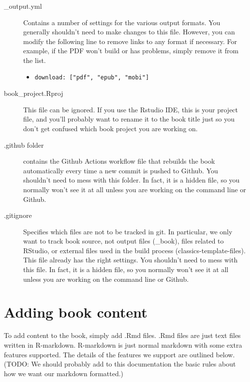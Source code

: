 \documentclass[
]{book}
\begin{document}
\begin{description}
\item[\_output.yml]
Contains a number of settings for the various output formats. You generally shouldn't need to make changes to this file. However, you can modify the following line to remove links to any format if necessary. For example, if the PDF won't build or has problems, simply remove it from the list.

\begin{itemize}
\item
\begin{verbatim}
download: ["pdf", "epub", "mobi"]
\end{verbatim}
\end{itemize}
\item[book\_project.Rproj]
This file can be ignored. If you use the Rstudio IDE, this is your project file, and you'll probably want to rename it to the book title just so you don't get confused which book project you are working on.
\item[.github folder]
contains the Github Actions workflow file that rebuilds the book automatically every time a new commit is pushed to Github. You shouldn't need to mess with this folder. In fact, it is a hidden file, so you normally won't see it at all unless you are working on the command line or Github.
\item[.gitignore]
Specifies which files are not to be tracked in git. In particular, we only want to track book source, not output files (\_book), files related to RStudio, or external files used in the build process (classics-template-files). This file already has the right settings. You shouldn't need to mess with this file. In fact, it is a hidden file, so you normally won't see it at all unless you are working on the command line or Github.
\end{description}

\hypertarget{adding-book-content}{%
\section{Adding book content}\label{adding-book-content}}

To add content to the book, simply add .Rmd files. .Rmd files are just text files written in R-markdown. R-markdown is just normal markdown with some extra features supported. The details of the features we support are outlined below. (TODO: We should probably add to this documentation the basic rules about how we want our markdown formatted.)
\end{document}
